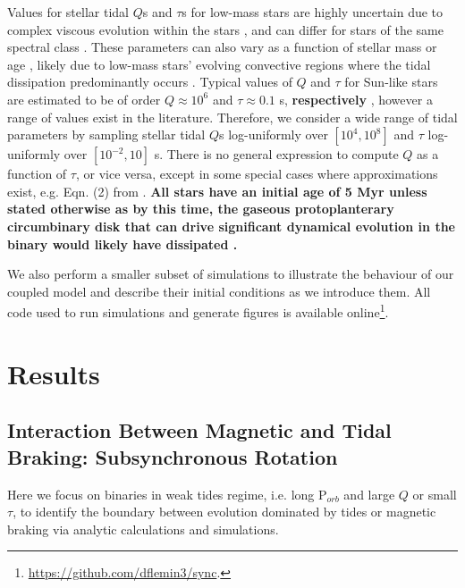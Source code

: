 \documentclass[twocolumn]{aastex61}
\newcommand{\xxx}[1]{{\textbf{#1}}}
\begin{document}
Values for stellar tidal $Q$s and $\tau$s for low-mass stars are highly uncertain due to complex viscous evolution within the stars \citep{Ogilvie2007}, and can differ for stars of the same spectral class \citep{Barker2009}. These parameters can also vary as a function of stellar mass or age \citep{Bolmont2016,vanEylen2016}, likely due to low-mass stars' evolving convective regions where the tidal dissipation predominantly occurs \citep{Zahn2008}. Typical values of $Q$ and $\tau$ for Sun-like stars are estimated to be of order $Q \approx 10^6$ and $\tau \approx 0.1$ s, \xxx{respectively} \citep[e.g.][]{Meibom2005,Ogilvie2007,Jackson2008}, however a range of values exist in the literature.  Therefore, we consider a wide range of tidal parameters by sampling stellar tidal $Q$s log-uniformly over $[10^4,10^8]$ and $\tau$ log-uniformly over $[10^{-2},10]$ s.  There is no general expression to compute $Q$ as a function of $\tau$, or vice versa, except in some special cases where approximations exist, e.g. Eqn. (2) from \citet{Heller2011}. \xxx{All stars have an initial age of 5 Myr unless stated otherwise as by this time, the gaseous protoplanterary circumbinary disk that can drive significant dynamical evolution in the binary \citep[e.g.][]{Fleming2017} would likely have dissipated \citep{Haisch2001}.}

We also perform a smaller subset of simulations to illustrate the behaviour of our coupled model and describe their initial conditions as we introduce them. All code used to run simulations and generate figures is available online\footnote{\href{https://github.com/dflemin3/sync}{https://github.com/dflemin3/sync}.}.



\section{Results} \label{sec:results}

\subsection{Interaction Between Magnetic and Tidal Braking: Subsynchronous Rotation} \label{sec:eq}

Here we focus on binaries in weak tides regime, i.e. long P$_{orb}$ and large $Q$ or small $\tau$, to identify the boundary between evolution dominated by tides or magnetic braking via analytic calculations and simulations.  
\end{document}
